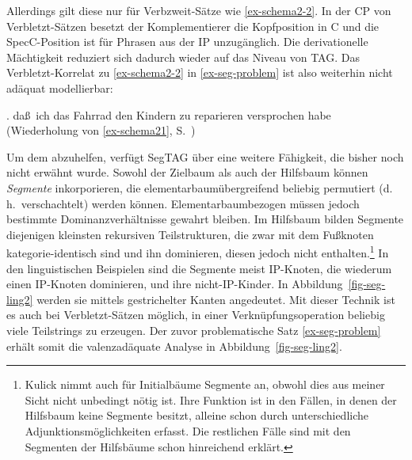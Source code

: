 \noindent Allerdings gilt diese  nur für Verbzweit-Sätze wie \ref{ex-schema2-2}. In der CP von Verbletzt-Sätzen besetzt der Komplementierer die Kopfposition in C und die SpecC-Position ist für Phrasen aus der IP unzugänglich. Die derivationelle Mächtigkeit reduziert sich dadurch wieder auf das Niveau von TAG. Das Verbletzt-Korrelat zu \ref{ex-schema2-2} in \ref{ex-seg-problem}  ist also weiterhin nicht adäquat modellierbar: 

\ex. da\ss \ ich das Fahrrad den Kindern zu reparieren versprochen habe\label{ex-seg-problem} \\ (Wiederholung von \ref{ex-schema21}, S.~\pageref{ex-schema21})

Um dem abzuhelfen, verfügt SegTAG über eine weitere Fähigkeit, die bisher noch nicht erwähnt wurde. Sowohl der Zielbaum als auch der Hilfsbaum können {\it Segmente} inkorporieren, die elementarbaumübergreifend beliebig permutiert (d.\,h.\ verschachtelt) werden können. Elementarbaumbezogen müssen jedoch bestimmte Dominanzverhältnisse gewahrt bleiben. Im Hilfsbaum bilden Segmente diejenigen kleinsten rekursiven Teilstrukturen, die zwar mit dem Fu\ss knoten kategorie-identisch sind und ihn dominieren, diesen jedoch nicht enthalten.\footnote{Kulick nimmt auch für Initialbäume Segmente an, obwohl dies aus meiner Sicht nicht unbedingt nötig ist. Ihre Funktion ist in den Fällen, in denen der Hilfsbaum keine Segmente besitzt, alleine schon durch unterschiedliche Adjunktionsmöglichkeiten erfasst. Die restlichen Fälle sind mit den Segmenten der Hilfsbäume schon hinreichend erklärt.} In den linguistischen Beispielen sind die Segmente meist IP-Knoten, die wiederum einen IP-Knoten dominieren, und ihre nicht-IP-Kinder. In Abbildung~\ref{fig-seg-ling2} werden sie mittels gestrichelter Kanten angedeutet. Mit dieser Technik ist es auch bei Verbletzt-Sätzen möglich, in einer Verknüpfungsoperation beliebig viele Teilstrings zu erzeugen. Der zuvor problematische Satz \ref{ex-seg-problem} erhält somit die valenzadäquate Analyse in Abbildung~\ref{fig-seg-ling2}.      


